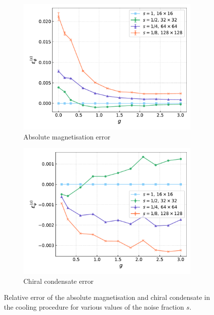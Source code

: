 \begin{figure}[htp]
    \centering
    \begin{subfigure}[b]{0.47\textwidth}
        \includegraphics[width=\textwidth]{figures/cooling/yukawa_scan/deviation.pdf}
        \caption{Absolute magnetisation error}
    \end{subfigure}
    \begin{subfigure}[b]{0.47\textwidth}
        \includegraphics[width=\textwidth]{figures/cooling/yukawa_scan/deviation_cond.pdf}
        \caption{Chiral condensate error}
    \end{subfigure}
    \caption[Relative error in the cooling procedure at tree level.]{Relative error of the absolute magnetisation and chiral condensate in the cooling procedure for various values of the noise fraction $s$.}
    \label{fig:cooling_deviation_yukawa}
\end{figure} \\
